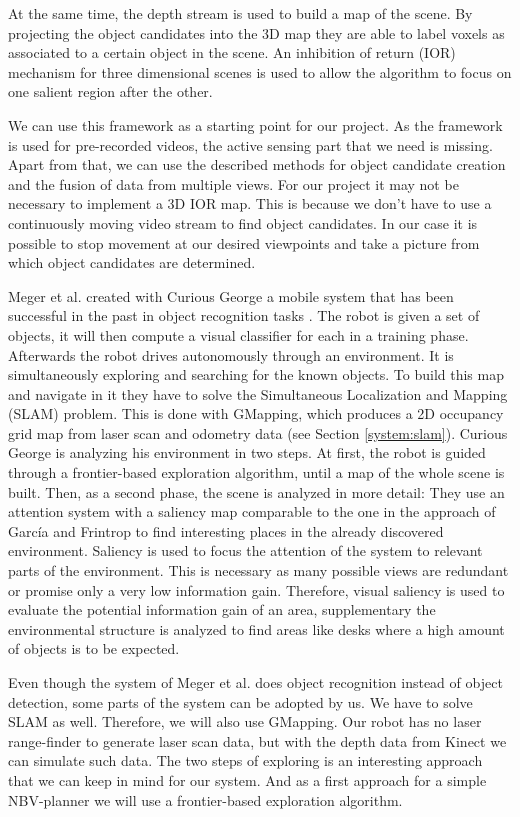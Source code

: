 \documentclass[a4paper,11pt,english]{article}
\begin{document}
At the same time, the depth stream is used to build a map of the scene.
By projecting the object candidates into the 3D map they are able to label voxels as associated to a certain object in the scene.
An inhibition of return (IOR) mechanism for three dimensional scenes is used to allow the algorithm to focus on one salient region after the other.

We can use this framework as a starting point for our project.
As the framework is used for pre-recorded videos, the active sensing part that we need is missing.
Apart from that, we can use the described methods for object candidate creation and the fusion of data from multiple views.
For our project it may not be necessary to implement a 3D IOR map. This is because we don't have to use a continuously moving video stream to find object candidates. In our case it is possible to stop movement at our desired viewpoints and take a picture from which object candidates are determined. \medskip

Meger et al. created with Curious George a mobile system that has been successful in the past in object recognition tasks \cite{meger2010curious}.
The robot is given a set of objects, it will then compute a visual classifier for each in a training phase.
Afterwards the robot drives autonomously through an environment. It is simultaneously exploring and searching for the known objects.
To build this map and navigate in it they have to solve the Simultaneous Localization and Mapping (SLAM) problem.
This is done with GMapping, which produces a 2D occupancy grid map from laser scan and odometry data (see Section \ref{system:slam}).
Curious George is analyzing his environment in two steps.
At first, the robot is guided through a frontier-based exploration algorithm, until a map of the whole scene is built.
Then, as a second phase, the scene is analyzed in more detail:
They use an attention system with a saliency map comparable to the one in the approach of García and Frintrop to find interesting places in the already discovered environment.
Saliency is used to focus the attention of the system to relevant parts of the environment. This is necessary as many possible views are redundant or promise only a very low information gain.
Therefore, visual saliency is used to evaluate the potential information gain of an area, supplementary the environmental structure is analyzed to find areas like desks where a high amount of objects is to be expected.

Even though the system of Meger et al. does object recognition instead of object detection, some parts of the system can be adopted by us.
We have to solve SLAM as well. Therefore, we will also use GMapping. Our robot has no laser range-finder to generate laser scan data, but with the depth data from Kinect we can simulate such data.
The two steps of exploring is an interesting approach that we can keep in mind for our system.
And as a first approach for a simple NBV-planner we will use a frontier-based exploration algorithm. \medskip
\end{document}
